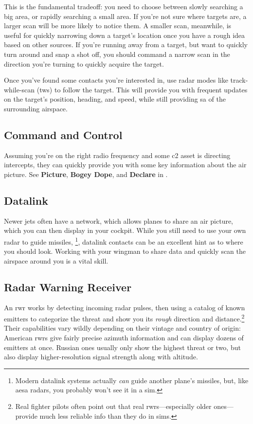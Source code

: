 This is the fundamental tradeoff: you need to choose between
slowly searching a big area, or rapidly searching a small area.
If you're not sure where targets are,
a larger scan will be more likely to notice them.
A smaller scan, meanwhile, is useful for quickly narrowing down a target's
location once you have a rough idea based on other sources.
If you're running away from a target, but want to quickly turn around and
snap a shot off,
you should command a narrow scan in the direction you're turning
to quickly acquire the target.

Once you've found some contacts you're interested in,
use radar modes like track-while-scan \ac{(tws)} to follow the target.
This will provide you with frequent updates on the target's position, heading,
and speed, while still providing \ac{sa} of the surrounding airspace.

\subsection{Command and Control}

Assuming you're on the right radio frequency and some \ac{c2} asset
is directing intercepts, they can quickly provide you with some key information
about the air picture. See \textbf{Picture}, \textbf{Bogey Dope},
and \textbf{Declare} in .

\subsection{Datalink}

Newer jets often have a  network, which allows
planes to share an air picture, which you can then display in your cockpit.
While you still need to use your own radar to guide missiles,\punckern%
\footnote{Modern datalink systems actually \emph{can} guide another plane's
missiles, but, like \ac{aesa} radars, you probably won't see it in a sim.},
datalink contacts can be an excellent hint as to where you should look.
Working with your wingman to share data and quickly scan the airspace around
you is a vital skill.

\subsection{Radar Warning Receiver}

An \ac{rwr} works by detecting incoming radar pulses,
then using a catalog of known emitters to categorize the threat
and show you its \emph{rough} direction and distance.\punckern\footnote{Real
fighter pilots often point out that real \ac{rwr}s---especially older
ones---provide much less reliable info than they do in sims.}
Their capabilities vary wildly depending on their vintage and country of origin:
American \ac{rwr}s give fairly precise azimuth information
and can display dozens of emitters at once.
Russian ones usually only show the highest threat or two,
but also display higher-resolution signal strength along with altitude.

